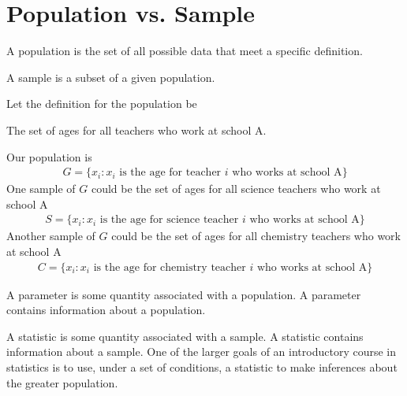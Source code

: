 \section{Population vs. Sample}

\begin{definition}
A population is the set of all possible data that meet a specific definition. 
\end{definition}

\begin{definition}
A sample is a subset of a given population.
\end{definition}

\begin{example}
Let the definition for the population be
\begin{center}
    The set of ages for all teachers who work at school A.
\end{center}
Our population is 
\begin{align*}
    G = \{x_{i}: x_{i} \hspace{4pt} \text{is the age for teacher} \hspace{4pt} i \hspace{4pt} \text{who works at school A}\}
\end{align*}
One sample of $G$ could be the set of ages for all science teachers who work at school A
\begin{align*}
    S = \{x_{i}: x_{i} \hspace{4pt} \text{is the age for science teacher} \hspace{4pt} i \hspace{4pt} \text{who works at school A}\}
\end{align*}
Another sample of $G$ could be the set of ages for all chemistry teachers who work at school A
\begin{align*}
    C = \{x_{i}: x_{i} \hspace{4pt} \text{is the age for chemistry teacher} \hspace{4pt} i \hspace{4pt} \text{who works at school A}\}
\end{align*}
\end{example}

\begin{definition}
A parameter is some quantity associated with a population. A parameter contains information about a population.
\end{definition}

\begin{definition}
A statistic is some quantity associated with a sample. A statistic contains information about a sample. One of the larger goals of an introductory course in statistics is to use, under a set of conditions, a statistic to make inferences about the greater population.  
\end{definition}

